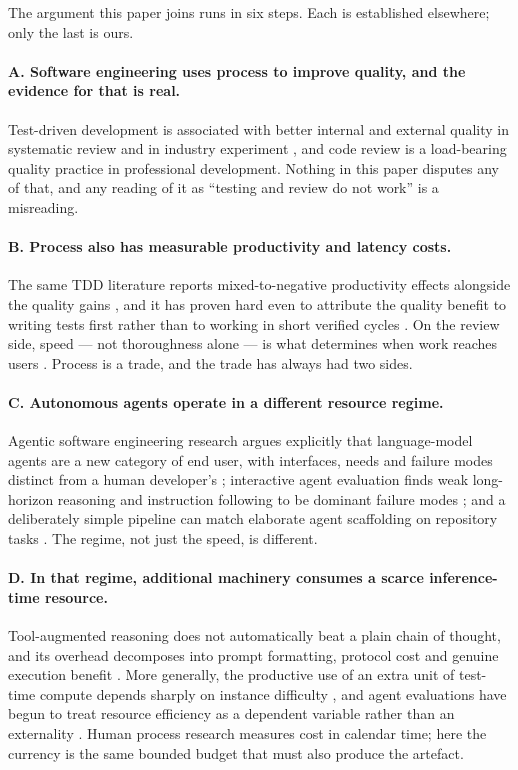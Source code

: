 \documentclass[11pt,a4paper]{article}
\begin{document}
The argument this paper joins runs in six steps. Each is established elsewhere; only the last
is ours.

\paragraph{A. Software engineering uses process to improve quality, and the evidence for that
is real.} Test-driven development is associated with better internal and external quality in
systematic review \citep{bissi2016tdd} and in industry experiment \citep{tosun2017industry},
and code review is a load-bearing quality practice in professional development. Nothing in
this paper disputes any of that, and any reading of it as ``testing and review do not work''
is a misreading.

\paragraph{B. Process also has measurable productivity and latency costs.} The same TDD
literature reports mixed-to-negative productivity effects alongside the quality gains
\citep{bissi2016tdd,tosun2017industry}, and it has proven hard even to attribute the quality
benefit to writing tests first rather than to working in short verified cycles
\citep{fucci2017dissection}. On the review side, speed --- not thoroughness alone --- is what
determines when work reaches users \citep{kudrjavets2024review}. Process is a trade, and the
trade has always had two sides.

\paragraph{C. Autonomous agents operate in a different resource regime.} Agentic software
engineering research argues explicitly that language-model agents are a new category of end
user, with interfaces, needs and failure modes distinct from a human developer's
\citep{yang2024sweagent}; interactive agent evaluation finds weak long-horizon reasoning and
instruction following to be dominant failure modes \citep{liu2024agentbench}; and a
deliberately simple pipeline can match elaborate agent scaffolding on repository tasks
\citep{xia2024agentless}. The regime, not just the speed, is different.

\paragraph{D. In that regime, additional machinery consumes a scarce inference-time resource.}
Tool-augmented reasoning does not automatically beat a plain chain of thought, and its
overhead decomposes into prompt formatting, protocol cost and genuine execution benefit
\citep{zhang2026tooltax}. More generally, the productive use of an extra unit of test-time
compute depends sharply on instance difficulty \citep{snell2024scaling}, and agent evaluations
have begun to treat resource efficiency as a dependent variable rather than an externality
\citep{liu2026costbench}. Human process research measures cost in calendar time; here the
currency is the same bounded budget that must also produce the artefact.
\end{document}
